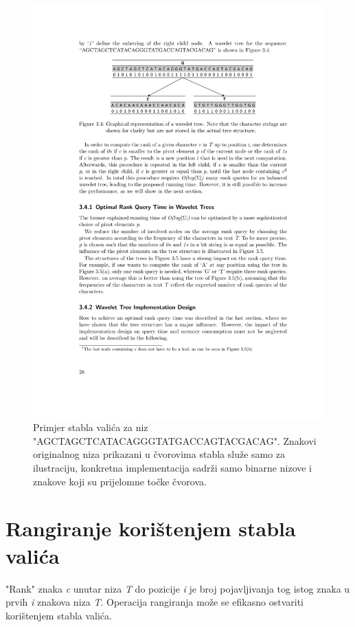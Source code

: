 \documentclass[times, utf8, seminar, numeric]{fer}
\begin{document}
\begin{figure}[!htb]
\centering
\includegraphics{fig/wavelet_ex1.pdf}
\caption{Primjer stabla valića za niz "AGCTAGCTCATACAGGGTATGACCAGTACGACAG". Znakovi
  originalnog niza prikazani u čvorovima stabla služe samo za ilustraciju, konkretna implementacija
  sadrži samo binarne nizove i znakove koji su prijelomne točke čvorova.}
\label{fig:wavelet_ex1}
\end{figure}

\section{Rangiranje korištenjem stabla valića}

"Rank" znaka \textit{c} unutar niza \textit{T} do pozicije \textit{i} je broj pojavljivanja
tog istog znaka u prvih \textit{i} znakova niza \textit{T}. Operacija rangiranja može
se efikasno ostvariti korištenjem stabla valića.
\end{document}
